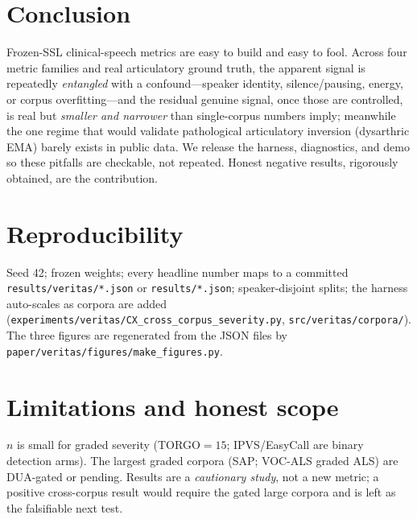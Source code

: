 \documentclass[10pt,twocolumn]{article}
\begin{document}
\section{Conclusion}
Frozen-SSL clinical-speech metrics are easy to build and easy to fool. Across
four metric families and real articulatory ground truth, the apparent signal is
repeatedly \emph{entangled} with a confound---speaker identity, silence/pausing,
energy, or corpus overfitting---and the residual genuine signal, once those are
controlled, is real but \emph{smaller and narrower} than single-corpus numbers
imply; meanwhile the one regime that would validate pathological articulatory
inversion (dysarthric EMA) barely exists in public data. We release the harness,
diagnostics, and demo so these pitfalls are checkable, not repeated. Honest
negative results, rigorously obtained, are the contribution.

\section*{Reproducibility}
Seed 42; frozen weights; every headline number maps to a committed
\texttt{results/veritas/*.json} or \texttt{results/*.json}; speaker-disjoint
splits; the harness auto-scales as corpora are added
(\texttt{experiments/veritas/CX\_cross\_corpus\_severity.py},
\texttt{src/veritas/corpora/}). The three figures are regenerated from the JSON
files by \texttt{paper/veritas/figures/make\_figures.py}.

\section*{Limitations and honest scope}
$n$ is small for graded severity (TORGO${=}15$; IPVS/EasyCall are binary
detection arms). The largest graded corpora (SAP; VOC-ALS graded ALS) are
DUA-gated or pending. Results are a \emph{cautionary study}, not a new metric; a
positive cross-corpus result would require the gated large corpora and is left
as the falsifiable next test.



\end{document}
